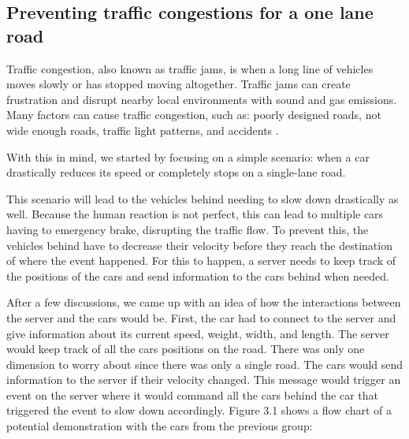 \subsection{Preventing traffic congestions for a one lane road}

Traffic congestion, also known as traffic jams, is when a long line of vehicles moves slowly or has stopped moving altogether. Traffic jams can create frustration and disrupt nearby local environments with sound and gas emissions. Many factors can cause traffic congestion, such as:
poorly designed roads, not wide enough roads, traffic light patterns, and accidents \parencite{traffic_congestion}.

With this in mind, we started by focusing on a simple scenario: when a car drastically reduces its speed or completely stops on a single-lane road. 

This scenario will lead to the vehicles behind needing to slow down drastically as well. Because the human reaction is not perfect, this can lead to multiple cars having to emergency brake, disrupting the traffic flow. To prevent this, the vehicles behind have to decrease their velocity before they reach the destination of where the event happened. For this to happen, a server needs to keep track of the positions of the cars and send information to the cars behind when needed. 

After a few discussions, we came up with an idea of how the interactions between the server and the cars would be. First, the car had to connect to the server and give information about its current speed, weight, width, and length. The server would keep track of all the cars positions on the road. There was only one dimension to worry about since there was only a single road. The cars would send information to the server if their velocity changed. This message would trigger an event on the server where it would command all the cars behind the car that triggered the event to slow down accordingly. Figure 3.1 shows a flow chart of a potential demonstration with the cars from the previous group:

